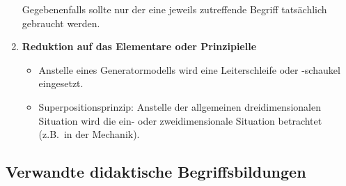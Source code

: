 \begin{enumerate}
	Gegebenenfalls sollte nur der eine jeweils zutreffende Begriff tats\"{a}chlich gebraucht werden.
	
	\item \textbf{Reduktion auf das Elementare oder Prinzipielle}
	\begin{itemize}
		\item Anstelle eines Generatormodells wird eine Leiterschleife oder
		-schaukel eingesetzt.
		\item Superpositionsprinzip: Anstelle der allgemeinen
		dreidimensionalen Situation wird die ein- oder zweidimensionale
		Situation betrachtet (z.B.\ in der Mechanik).
	\end{itemize}
\end{enumerate}
\subsection{Verwandte didaktische Begriffsbildungen}

